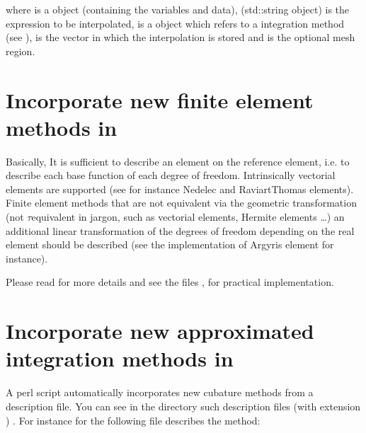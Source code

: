 \documentclass[a4paper,11pt,english]{sphinxmanual}
\begin{document}
where  is a  object (containing the variables and data),  (std::string object) is the expression to be interpolated,  is a  object which refers to a integration method (see ),  is the vector in which the interpolation is stored and  is the optional mesh region.


\chapter{Incorporate new finite element methods in }
\label{\detokenize{userdoc/ifem:incorporate-new-finite-element-methods-in-gf}}\label{\detokenize{userdoc/ifem:ud-ifem}}\label{\detokenize{userdoc/ifem::doc}}
Basically, It is sufficient to describe an element on the reference element, i.e.
to describe each base function of each degree of freedom. Intrinsically vectorial
elements are supported (see for instance Nedelec and Raviart\sphinxhyphen{}Thomas elements).
Finite element methods that are not equivalent via the geometric transformation
(not \(\tau\)\sphinxhyphen{}equivalent in  jargon, such as vectorial elements, Hermite
elements …) an additional linear transformation of the degrees of freedom
depending on the real element should be described (see the implementation of
Argyris element for instance).

Please read  for more details and see the files
,  for practical implementation.


\chapter{Incorporate new approximated integration methods in }
\label{\detokenize{userdoc/iinteg:incorporate-new-approximated-integration-methods-in-gf}}\label{\detokenize{userdoc/iinteg:ud-iinteg}}\label{\detokenize{userdoc/iinteg::doc}}
A perl script automatically incorporates new cubature methods from a description
file. You can see in the directory  such description files (with
extension ) . For instance for  the following file
describes the method:
\end{document}
